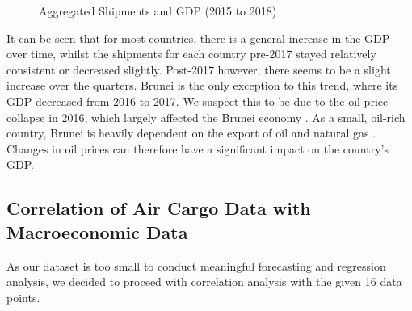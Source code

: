 \documentclass{article}
\begin{document}
\begin{subfigures}
\begin{figure}[H]
        \qquad
        \qquad
        \caption{Aggregated Shipments and GDP (2015 to 2018)}
    \end{figure}
\end{subfigures}

\noindent It can be seen that for most countries, there is a general increase in the GDP over time, whilst the shipments for each country pre-2017 stayed relatively consistent or decreased slightly. Post-2017 however, there seems to be a slight increase over the quarters. Brunei is the only exception to this trend, where its GDP decreased from 2016 to 2017. We suspect this to be due to the oil price collapse in 2016, which largely affected the Brunei economy \cite{BruneiOil}. As a small, oil-rich country, Brunei is heavily dependent on the export of oil and natural gas \cite{Bruneioil2}. Changes in oil prices can therefore have a significant impact on the country's GDP. 

\newpage

\subsection{Correlation of Air Cargo Data with Macroeconomic Data}

As our dataset is too small to conduct meaningful forecasting and regression analysis, we decided to proceed with correlation analysis with the given 16 data points. 
\end{document}
